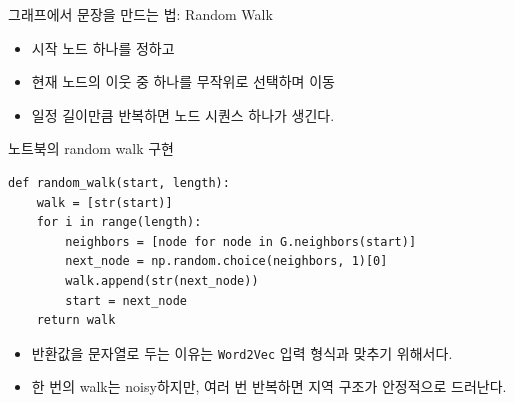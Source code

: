 \begin{frame}{그래프에서 문장을 만드는 법: Random Walk}
\begin{itemize}
  \item 시작 노드 하나를 정하고
  \item 현재 노드의 이웃 중 하나를 무작위로 선택하며 이동
  \item 일정 길이만큼 반복하면 노드 시퀀스 하나가 생긴다.
\end{itemize}
\vspace{0.4em}
\begin{center}
\end{center}
\end{frame}

\begin{frame}[fragile]{노트북의 random walk 구현}
\begin{lstlisting}
def random_walk(start, length):
    walk = [str(start)]
    for i in range(length):
        neighbors = [node for node in G.neighbors(start)]
        next_node = np.random.choice(neighbors, 1)[0]
        walk.append(str(next_node))
        start = next_node
    return walk
\end{lstlisting}
\begin{itemize}
  \item 반환값을 문자열로 두는 이유는 \texttt{Word2Vec} 입력 형식과 맞추기 위해서다.
  \item 한 번의 walk는 noisy하지만, 여러 번 반복하면 지역 구조가 안정적으로 드러난다.
\end{itemize}
\end{frame}

